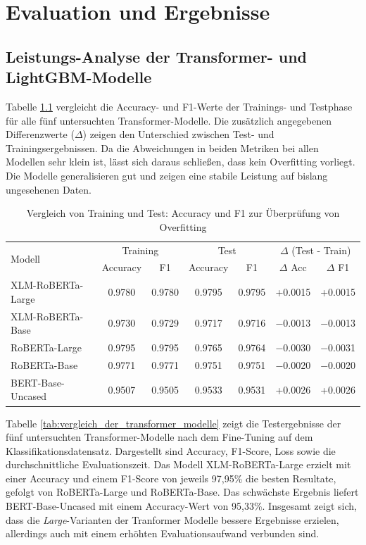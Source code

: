\chapter{Evaluation und Ergebnisse}
\label{chap:evaluation_und_ergebnisse}

\section{Leistungs-Analyse der Transformer- und LightGBM-Modelle}

Tabelle \ref{tab:overfitting_check} vergleicht die Accuracy- und F1-Werte der Trainings- und Testphase für alle fünf untersuchten Transformer-Modelle. 
Die zusätzlich angegebenen Differenzwerte ($\Delta$) zeigen den Unterschied zwischen Test- und Trainingsergebnissen. 
Da die Abweichungen in beiden Metriken bei allen Modellen sehr klein ist, lässt sich daraus schließen, dass kein Overfitting vorliegt. 
Die Modelle generalisieren gut und zeigen eine stabile Leistung auf bislang ungesehenen Daten.

\begin{table}[ht]
\centering
\begin{tabular}{lcccccc}
    \toprule
    \multirow{2}{*}{Modell} & 
    \multicolumn{2}{c}{Training} & 
    \multicolumn{2}{c}{Test} & 
    \multicolumn{2}{c}{$\Delta$ (Test - Train)} \\
    \cmidrule(lr){2-3} \cmidrule(lr){4-5} \cmidrule(l){6-7}
    & Accuracy & F1 & Accuracy & F1 & $\Delta$ Acc & $\Delta$ F1 \\
    \midrule
    XLM-RoBERTa-Large   & 0.9780 & 0.9780 & 0.9795 & 0.9795 & +0.0015 & +0.0015 \\
    XLM-RoBERTa-Base    & 0.9730 & 0.9729 & 0.9717 & 0.9716 & $-$0.0013 & $-$0.0013 \\
    RoBERTa-Large       & 0.9795 & 0.9795 & 0.9765 & 0.9764 & $-$0.0030 & $-$0.0031 \\
    RoBERTa-Base        & 0.9771 & 0.9771 & 0.9751 & 0.9751 & $-$0.0020 & $-$0.0020 \\
    BERT-Base-Uncased   & 0.9507 & 0.9505 & 0.9533 & 0.9531 & +0.0026 & +0.0026 \\
    \bottomrule
\end{tabular}
\caption{Vergleich von Training und Test: Accuracy und F1 zur Überprüfung von Overfitting}
\label{tab:overfitting_check}
\end{table}

Tabelle \ref{tab:vergleich_der_transformer_modelle} zeigt die Testergebnisse der fünf untersuchten Transformer-Modelle nach dem Fine-Tuning auf dem 
Klassifikationsdatensatz. 
Dargestellt sind Accuracy, F1-Score, Loss sowie die durchschnittliche Evaluationszeit. Das Modell XLM-RoBERTa-Large erzielt mit einer 
Accuracy und einem F1-Score von jeweils 97,95\% die besten Resultate, gefolgt von RoBERTa-Large und RoBERTa-Base. 
Das schwächste Ergebnis liefert BERT-Base-Uncased mit einem Accuracy-Wert von 95,33\%. Insgesamt zeigt sich, dass die \textit{Large}-Varianten
der Tranformer Modelle bessere Ergebnisse erzielen, allerdings auch mit einem erhöhten Evaluationsaufwand verbunden sind.

